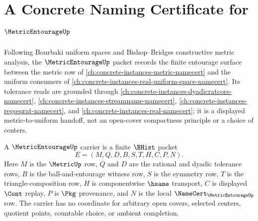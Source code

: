 \chapter{A Concrete Naming Certificate for $\MetricEntourageUp$}
\label{ch:concrete-instances-metric-entourage-namecert}

Following Bourbaki uniform spaces and Bishop--Bridges constructive metric analysis, the $\MetricEntourageUp$ packet records the finite entourage surface between the metric row of \autoref{ch:concrete-instances-metric-namecert} and the uniform consumers of \autoref{ch:concrete-instances-real-uniform-space-namecert}. Its tolerance reads are grounded through \autoref{ch:concrete-instances-dyadicratcore-namecert}, \autoref{ch:concrete-instances-streamname-namecert}, \autoref{ch:concrete-instances-regseqrat-namecert}, and \autoref{ch:concrete-instances-real-namecert}; it is a displayed metric-to-uniform handoff, not an open-cover compactness principle or a choice of centers.

\begin{definition}
\label{def:metric-entourage-carrier}
A $\MetricEntourageUp$ carrier is a finite $\BHist$ packet
$$
E=(M,Q,D,B,S,T,H,C,P,N).
$$
Here $M$ is the $\MetricUp$ row, $Q$ and $D$ are the rational and dyadic tolerance rows, $B$ is the ball-and-entourage witness row, $S$ is the symmetry row, $T$ is the triangle-composition row, $H$ is componentwise $\hsame$ transport, $C$ is displayed $\Cont$ replay, $P$ is $\Pkg$ provenance, and $N$ is the local $\NameCert_{\MetricEntourageUp}$ row. The carrier has no coordinate for arbitrary open covers, selected centers, quotient points, countable choice, or ambient completion.
\end{definition}

